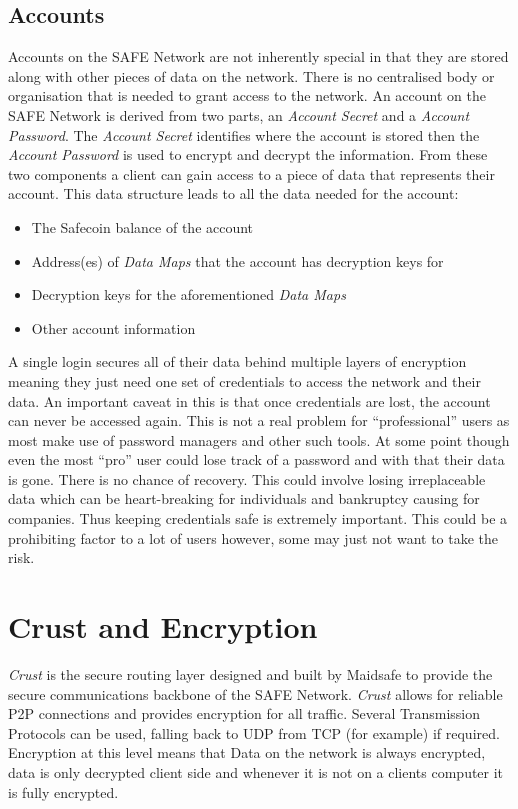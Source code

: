\subsection{Accounts}

Accounts on the SAFE Network are not inherently special in that they are stored along with other pieces of data on the network. There is no centralised body or organisation that is needed to grant access to the network. An account on the SAFE Network is derived from two parts, an \textit{Account Secret} and a \textit{Account Password}. The \textit{Account Secret} identifies where the account is stored then the \textit{Account Password} is used to encrypt and decrypt the information. From these two components a client can gain access to a piece of data that represents their account. This data structure leads to all the data needed for the account:

\begin{itemize}
	\item The Safecoin balance of the account
	\item Address(es) of \textit{Data Maps} that the account has decryption keys for
	\item Decryption keys for the aforementioned \textit{Data Maps}
	\item Other account information
\end{itemize}
	
A single login secures all of their data behind multiple layers of encryption meaning they just need one set of credentials to access the network and their data. An important caveat in this is that once credentials are lost, the account can never be accessed again. This is not a real problem for ``professional'' users as most make use of password managers and other such tools. At some point though even the most ``pro'' user could lose track of a password and with that their data is gone. There is no chance of recovery. This could involve losing irreplaceable data which can be heart-breaking for individuals and bankruptcy causing for companies. Thus keeping credentials safe is extremely important. This could be a prohibiting factor to a lot of users however, some may just not want to take the risk.

\section{Crust and Encryption}

\textit{Crust} is the secure routing layer designed and built by Maidsafe to provide the secure communications backbone of the SAFE Network. \textit{Crust} allows for reliable P2P connections and provides encryption for all traffic. Several Transmission Protocols can be used, falling back to UDP from TCP (for example) if required. Encryption at this level means that Data on the network is always encrypted, data is only decrypted client side and whenever it is not on a clients computer it is fully encrypted.

